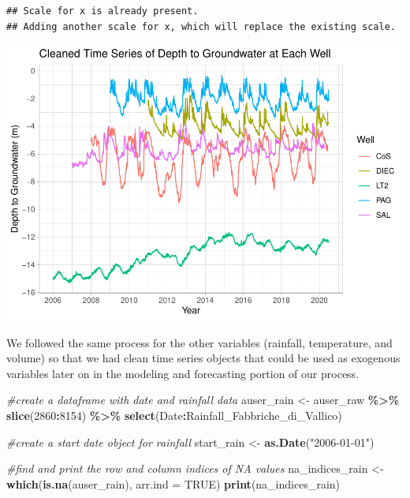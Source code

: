 \documentclass[
]{article}
\newenvironment{Shaded}{\begin{snugshade}}{\end{snugshade}}
\newcommand{\AttributeTok}[1]{\textcolor[rgb]{0.13,0.29,0.53}{#1}}
\newcommand{\CommentTok}[1]{\textcolor[rgb]{0.56,0.35,0.01}{\textit{#1}}}
\newcommand{\ConstantTok}[1]{\textcolor[rgb]{0.56,0.35,0.01}{#1}}
\newcommand{\DecValTok}[1]{\textcolor[rgb]{0.00,0.00,0.81}{#1}}
\newcommand{\FunctionTok}[1]{\textcolor[rgb]{0.13,0.29,0.53}{\textbf{#1}}}
\newcommand{\NormalTok}[1]{#1}
\newcommand{\OtherTok}[1]{\textcolor[rgb]{0.56,0.35,0.01}{#1}}
\newcommand{\SpecialCharTok}[1]{\textcolor[rgb]{0.81,0.36,0.00}{\textbf{#1}}}
\newcommand{\StringTok}[1]{\textcolor[rgb]{0.31,0.60,0.02}{#1}}
\begin{document}
\begin{verbatim}
## Scale for x is already present.
## Adding another scale for x, which will replace the existing scale.
\end{verbatim}

\includegraphics{Kaufman_McNeill_ENV797_Project_files/figure-latex/unnamed-chunk-3-2.pdf}

We followed the same process for the other variables (rainfall,
temperature, and volume) so that we had clean time series objects that
could be used as exogenous variables later on in the modeling and
forecasting portion of our process.

\begin{Shaded}
\begin{Highlighting}[]
\CommentTok{\#create a dataframe with date and rainfall data}
\NormalTok{auser\_rain }\OtherTok{\textless{}{-}}\NormalTok{ auser\_raw }\SpecialCharTok{\%\textgreater{}\%} 
  \FunctionTok{slice}\NormalTok{(}\DecValTok{2860}\SpecialCharTok{:}\DecValTok{8154}\NormalTok{) }\SpecialCharTok{\%\textgreater{}\%} 
  \FunctionTok{select}\NormalTok{(Date}\SpecialCharTok{:}\NormalTok{Rainfall\_Fabbriche\_di\_Vallico)}

\CommentTok{\#create a start date object for rainfall}
\NormalTok{start\_rain }\OtherTok{\textless{}{-}} \FunctionTok{as.Date}\NormalTok{(}\StringTok{"2006{-}01{-}01"}\NormalTok{)}

\CommentTok{\#find and print the row and column indices of NA values}
\NormalTok{na\_indices\_rain }\OtherTok{\textless{}{-}} \FunctionTok{which}\NormalTok{(}\FunctionTok{is.na}\NormalTok{(auser\_rain), }\AttributeTok{arr.ind =} \ConstantTok{TRUE}\NormalTok{)}
\FunctionTok{print}\NormalTok{(na\_indices\_rain)}
\end{Highlighting}
\end{Shaded}
\end{document}
